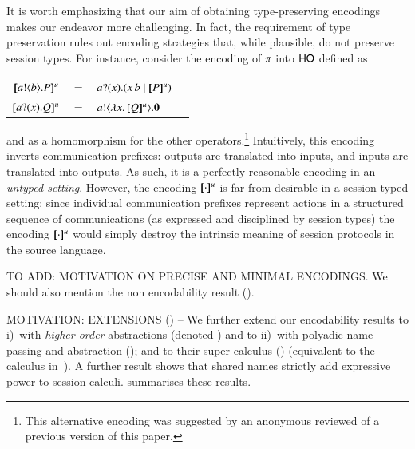 It is worth emphasizing that our aim of obtaining type-preserving encodings 
makes our endeavor more challenging.
In fact, the requirement of type preservation rules out encoding strategies that, while plausible, do 
not preserve session types. For instance, consider the 
encoding of $\pi$ into $\mathsf{HO}$ defined as
\begin{center}
\begin{tabular}{rcll}
  $[\!\![a ! \langle b \rangle . P]\!\!]^u$	&$=$&	$a ? (x) .( x\, {b} \;|\; [\!\![P]\!\!]^u)$ \\
  $[\!\![a ? (x) . Q]\!\!]^u$	&$=$&	$a ! \langle \lambda x.\,[\!\![Q]\!\!]^u \rangle . \mathbf{0}$
\end{tabular}
\end{center}
and as a homomorphism for the other operators.\footnote{This alternative  encoding was suggested by an anonymous reviewed of a previous version of this paper.}
Intuitively, this encoding inverts communication prefixes: outputs are translated into inputs, and inputs are translated into outputs. 
As such, it is a perfectly reasonable encoding in an \emph{untyped setting}. However, the encoding $[\!\![\cdot]\!\!]^u$  is far from desirable in a session typed setting: since 
individual communication prefixes represent actions in a structured sequence of communications (as expressed and disciplined by session types)
the encoding $[\!\![\cdot]\!\!]^u$ would simply destroy the intrinsic meaning of session protocols in the source language.

TO ADD: MOTIVATION ON PRECISE AND MINIMAL ENCODINGS. We should also mention the non encodability result ().

MOTIVATION: EXTENSIONS () -- We further extend our encodability results to 
i)~\HOp with \emph{higher-order} abstractions (denoted \HOpp) 
and to ii)~\HOp with polyadic name passing and abstraction (\pHOp); and to
their super-calculus  (\PHOpp) (equivalent to the calculus in~\cite{tlca07}). 
A further result shows that 
shared names
strictly add expressive power 
to session calculi. 
 summarises %
these results. %

